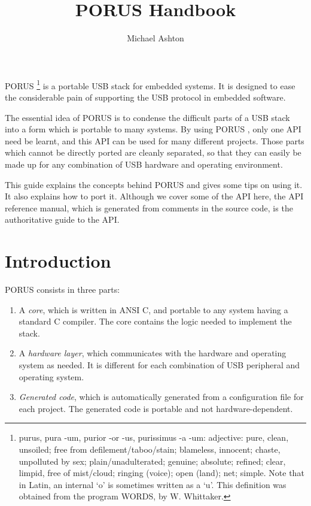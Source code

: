 \documentclass[a4paper]{book}
\newcommand{\porus}{PORUS }
\begin{document}
\title{PORUS Handbook}
\author{Michael Ashton}
\maketitle

\porus\footnote{purus, pura -um, purior -or -us, purissimus -a -um:  adjective: pure, clean, unsoiled; free from defilement/taboo/stain; blameless, innocent; chaste, unpolluted by sex; plain/unadulterated; genuine; absolute; refined; clear, limpid, free of mist/cloud; ringing (voice); open (land); net; simple.  Note that in Latin, an internal `o' is sometimes written as a `u'.  This definition was obtained from the program WORDS, by W. Whittaker.} is a portable USB stack for embedded systems.  It is designed to ease the considerable pain of supporting the USB protocol in embedded software.

The essential idea of \porus is to condense the difficult parts of a USB stack into a form which is portable to many systems.  By using \porus, only one API need be learnt, and this API can be used for many different projects. Those parts which cannot be directly ported are cleanly separated, so that they can easily be made up for any combination of USB hardware and operating environment.

This guide explains the concepts behind \porus and gives some tips on using it.  It also explains how to port it.  Although we cover some of the API here, the API reference manual, which is generated from comments in the source code, is the authoritative guide to the API.

\chapter{Introduction}

\porus consists in three parts:

\begin{enumerate}
\item A \emph{core}, which is written in ANSI C, and portable to any system having a standard C compiler.  The core contains the logic needed to implement the stack.
\item A \emph{hardware layer}, which communicates with the hardware and operating system as needed.  It is different for each combination of USB peripheral and operating system.
\item \emph{Generated code}, which is automatically generated from a configuration file for each project.  The generated code is portable and not hardware-dependent.
\end{enumerate}
\end{document}
